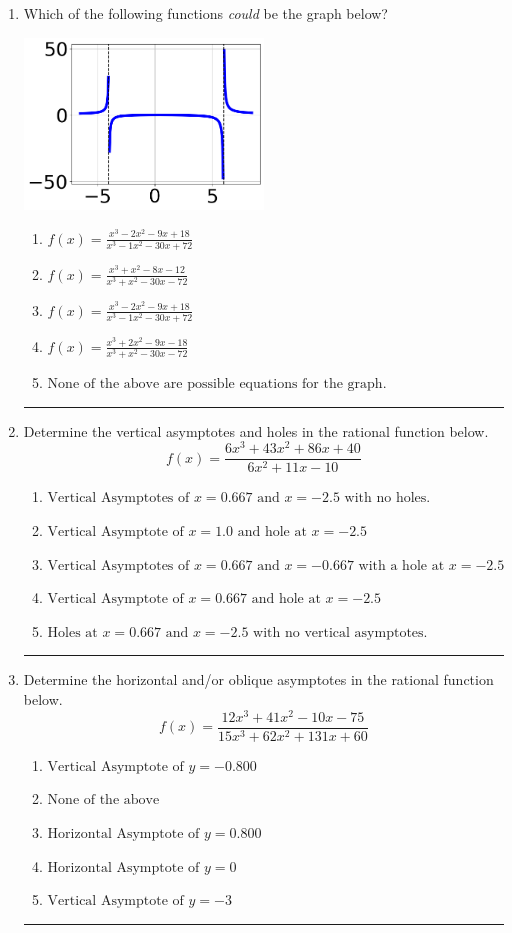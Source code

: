 \documentclass[14pt]{extbook}
\newcommand{\litem}[1]{\item#1\hspace*{-1cm}\rule{\textwidth}{0.4pt}}
\begin{document}
\begin{enumerate}
{\begin{enumerate}[label=\Alph*.]
\end{enumerate} }
\litem{
Which of the following functions \textit{could} be the graph below?
\begin{center}
    \includegraphics[width=0.5\textwidth]{../Figures/identifyGraphOfRationalFunctionB.png}
\end{center}
\begin{enumerate}[label=\Alph*.]
\item \( f(x)=\frac{x^{3} -2 x^{2} -9 x + 18}{x^{3} -1 x^{2} -30 x + 72} \)
\item \( f(x)=\frac{x^{3} + x^{2} -8 x -12}{x^{3} + x^{2} -30 x -72} \)
\item \( f(x)=\frac{x^{3} -2 x^{2} -9 x + 18}{x^{3} -1 x^{2} -30 x + 72} \)
\item \( f(x)=\frac{x^{3} +2 x^{2} -9 x -18}{x^{3} + x^{2} -30 x -72} \)
\item \( \text{None of the above are possible equations for the graph.} \)

\end{enumerate} }
\litem{
Determine the vertical asymptotes and holes in the rational function below.\[ f(x) = \frac{6x^{3} +43 x^{2} +86 x + 40}{6x^{2} +11 x -10} \]\begin{enumerate}[label=\Alph*.]
\item \( \text{Vertical Asymptotes of } x = 0.667 \text{ and } x = -2.5 \text{ with no holes.} \)
\item \( \text{Vertical Asymptote of } x = 1.0 \text{ and hole at } x = -2.5 \)
\item \( \text{Vertical Asymptotes of } x = 0.667 \text{ and } x = -0.667 \text{ with a hole at } x = -2.5 \)
\item \( \text{Vertical Asymptote of } x = 0.667 \text{ and hole at } x = -2.5 \)
\item \( \text{Holes at } x = 0.667 \text{ and } x = -2.5 \text{ with no vertical asymptotes.} \)

\end{enumerate} }
\litem{
Determine the horizontal and/or oblique asymptotes in the rational function below.\[ f(x) = \frac{12x^{3} +41 x^{2} -10 x -75}{15x^{3} +62 x^{2} +131 x + 60} \]\begin{enumerate}[label=\Alph*.]
\item \( \text{Vertical Asymptote of } y = -0.800  \)
\item \( \text{None of the above} \)
\item \( \text{Horizontal Asymptote of } y = 0.800  \)
\item \( \text{Horizontal Asymptote of } y = 0  \)
\item \( \text{Vertical Asymptote of } y = -3  \)


\end{enumerate}}
\end{enumerate}
\end{document}
